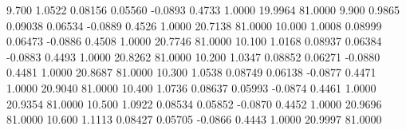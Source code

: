    9.700   1.0522   0.08156   0.05560  -0.0893   0.4733   1.0000  19.9964  81.0000
   9.900   0.9865   0.09038   0.06534  -0.0889   0.4526   1.0000  20.7138  81.0000
  10.000   1.0008   0.08999   0.06473  -0.0886   0.4508   1.0000  20.7746  81.0000
  10.100   1.0168   0.08937   0.06384  -0.0883   0.4493   1.0000  20.8262  81.0000
  10.200   1.0347   0.08852   0.06271  -0.0880   0.4481   1.0000  20.8687  81.0000
  10.300   1.0538   0.08749   0.06138  -0.0877   0.4471   1.0000  20.9040  81.0000
  10.400   1.0736   0.08637   0.05993  -0.0874   0.4461   1.0000  20.9354  81.0000
  10.500   1.0922   0.08534   0.05852  -0.0870   0.4452   1.0000  20.9696  81.0000
  10.600   1.1113   0.08427   0.05705  -0.0866   0.4443   1.0000  20.9997  81.0000
